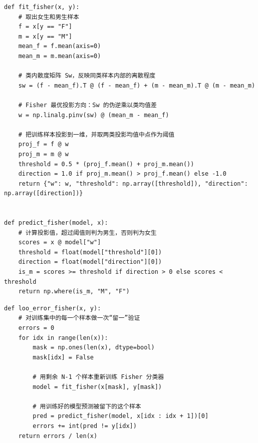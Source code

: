 \documentclass[UTF8,a4paper,12pt]{ctexart}
\begin{document}
\begin{lstlisting}[caption={Exp.2 Fisher linear discriminant},label={lst:exp2-fisher}]
def fit_fisher(x, y):
    # 取出女生和男生样本
    f = x[y == "F"]
    m = x[y == "M"]
    mean_f = f.mean(axis=0)
    mean_m = m.mean(axis=0)

    # 类内散度矩阵 Sw，反映同类样本内部的离散程度
    sw = (f - mean_f).T @ (f - mean_f) + (m - mean_m).T @ (m - mean_m)

    # Fisher 最优投影方向：Sw 的伪逆乘以类均值差
    w = np.linalg.pinv(sw) @ (mean_m - mean_f)

    # 把训练样本投影到一维，并取两类投影均值中点作为阈值
    proj_f = f @ w
    proj_m = m @ w
    threshold = 0.5 * (proj_f.mean() + proj_m.mean())
    direction = 1.0 if proj_m.mean() > proj_f.mean() else -1.0
    return {"w": w, "threshold": np.array([threshold]), "direction": np.array([direction])}


def predict_fisher(model, x):
    # 计算投影值，超过阈值则判为男生，否则判为女生
    scores = x @ model["w"]
    threshold = float(model["threshold"][0])
    direction = float(model["direction"][0])
    is_m = scores >= threshold if direction > 0 else scores < threshold
    return np.where(is_m, "M", "F")
\end{lstlisting}

\begin{lstlisting}[caption={Exp.2 leave-one-out validation},label={lst:exp2-loo}]
def loo_error_fisher(x, y):
    # 对训练集中的每一个样本做一次“留一”验证
    errors = 0
    for idx in range(len(x)):
        mask = np.ones(len(x), dtype=bool)
        mask[idx] = False

        # 用剩余 N-1 个样本重新训练 Fisher 分类器
        model = fit_fisher(x[mask], y[mask])

        # 用训练好的模型预测被留下的这个样本
        pred = predict_fisher(model, x[idx : idx + 1])[0]
        errors += int(pred != y[idx])
    return errors / len(x)
\end{lstlisting}
\end{document}
